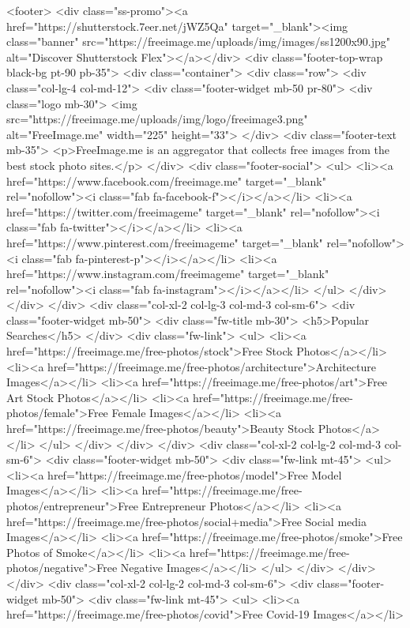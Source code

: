 <footer>
<div class="ss-promo"><a href="https://shutterstock.7eer.net/jWZ5Qa" target="_blank"><img class="banner" src="https://freeimage.me/uploads/img/images/ss1200x90.jpg" alt="Discover Shutterstock Flex"></a></div>
<div class="footer-top-wrap black-bg pt-90 pb-35">
<div class="container">
<div class="row">
<div class="col-lg-4 col-md-12">
<div class="footer-widget mb-50 pr-80">
<div class="logo mb-30">
<img src="https://freeimage.me/uploads/img/logo/freeimage3.png" alt="FreeImage.me" width="225" height="33">
</div>
<div class="footer-text mb-35">
<p>FreeImage.me is an aggregator that collects free images from the best stock photo sites.</p>
</div>
<div class="footer-social">
<ul>
<li><a href="https://www.facebook.com/freeimage.me" target="_blank" rel="nofollow"><i class="fab fa-facebook-f"></i></a></li>
<li><a href="https://twitter.com/freeimageme" target="_blank" rel="nofollow"><i class="fab fa-twitter"></i></a></li>
<li><a href="https://www.pinterest.com/freeimageme" target="_blank" rel="nofollow"><i class="fab fa-pinterest-p"></i></a></li>
<li><a href="https://www.instagram.com/freeimageme" target="_blank" rel="nofollow"><i class="fab fa-instagram"></i></a></li>
</ul>
</div>
</div>
</div>
<div class="col-xl-2 col-lg-3 col-md-3 col-sm-6">
<div class="footer-widget mb-50">
<div class="fw-title mb-30">
<h5>Popular Searches</h5>
</div>
<div class="fw-link">
<ul>
<li><a href="https://freeimage.me/free-photos/stock">Free Stock Photos</a></li>
<li><a href="https://freeimage.me/free-photos/architecture">Architecture Images</a></li>
<li><a href="https://freeimage.me/free-photos/art">Free Art Stock Photos</a></li>
<li><a href="https://freeimage.me/free-photos/female">Free Female Images</a></li>
<li><a href="https://freeimage.me/free-photos/beauty">Beauty Stock Photos</a></li>
</ul>
</div>
</div>
</div>
<div class="col-xl-2 col-lg-2 col-md-3 col-sm-6">
<div class="footer-widget mb-50">
<div class="fw-link mt-45">
<ul>
<li><a href="https://freeimage.me/free-photos/model">Free Model Images</a></li>
<li><a href="https://freeimage.me/free-photos/entrepreneur">Free Entrepreneur Photos</a></li>
<li><a href="https://freeimage.me/free-photos/social+media">Free Social media Images</a></li>
<li><a href="https://freeimage.me/free-photos/smoke">Free Photos of Smoke</a></li>
<li><a href="https://freeimage.me/free-photos/negative">Free Negative Images</a></li>
</ul>
</div>
</div>
</div>
<div class="col-xl-2 col-lg-2 col-md-3 col-sm-6">
<div class="footer-widget mb-50">
<div class="fw-link mt-45">
<ul>
<li><a href="https://freeimage.me/free-photos/covid">Free Covid-19 Images</a></li>
